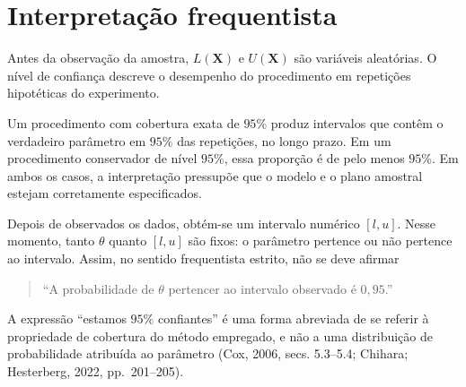 \documentclass[
  letterpaper,
  DIV=11,
  numbers=noendperiod]{scrreprt}
\begin{document}
\section{Interpretação
frequentista}\label{interpretauxe7uxe3o-frequentista}

Antes da observação da amostra, \(L(\mathbf{X})\) e \(U(\mathbf{X})\)
são variáveis aleatórias. O nível de confiança descreve o desempenho do
procedimento em repetições hipotéticas do experimento.

\begin{tcolorbox}[enhanced jigsaw, colback=white, leftrule=.75mm, colbacktitle=quarto-callout-tip-color!10!white, breakable, titlerule=0mm, bottomtitle=1mm, title=\textcolor{quarto-callout-tip-color}{\faLightbulb}\hspace{0.5em}{Interpretação correta}, colframe=quarto-callout-tip-color-frame, toprule=.15mm, opacityback=0, bottomrule=.15mm, opacitybacktitle=0.6, arc=.35mm, toptitle=1mm, rightrule=.15mm, coltitle=black, left=2mm]

Um procedimento com cobertura exata de \(95\%\) produz intervalos que
contêm o verdadeiro parâmetro em \(95\%\) das repetições, no longo
prazo. Em um procedimento conservador de nível \(95\%\), essa proporção
é de pelo menos \(95\%\). Em ambos os casos, a interpretação pressupõe
que o modelo e o plano amostral estejam corretamente especificados.

\end{tcolorbox}

Depois de observados os dados, obtém-se um intervalo numérico \([l,u]\).
Nesse momento, tanto \(\theta\) quanto \([l,u]\) são fixos: o parâmetro
pertence ou não pertence ao intervalo. Assim, no sentido frequentista
estrito, não se deve afirmar

\begin{quote}
``A probabilidade de \(\theta\) pertencer ao intervalo observado é
\(0{,}95\).''
\end{quote}

A expressão ``estamos \(95\%\) confiantes'' é uma forma abreviada de se
referir à propriedade de cobertura do método empregado, e não a uma
distribuição de probabilidade atribuída ao parâmetro (Cox, 2006, secs.
5.3--5.4; Chihara; Hesterberg, 2022, pp.~201--205).
\end{document}
